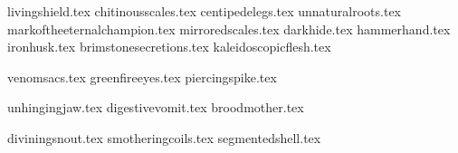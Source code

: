 

\daemonicmanifestationsintro

\subsubtitle{\guidingmanifestations}

\guidingmanifestationsdef

\subtitle{\manifestationsoffatherchaos}

\raggedcolumns
\begin{multicols}{2}

\startsortedpricelisthtgtNSP

{livingshield.tex}
{chitinousscales.tex}
{centipedelegs.tex}
{unnaturalroots.tex}
{markoftheeternalchampion.tex}
{mirroredscales.tex}
{darkhide.tex}
{hammerhand.tex}
{ironhusk.tex}
{brimstonesecretions.tex}
{kaleidoscopicflesh.tex}

\endsortedpricelisthtgtNSP

\subtitle{\manifestationsofenvy}

\startsortedpricelisthtgt

{venomsacs.tex}
{greenfireeyes.tex}
{piercingspike.tex}

\endsortedpricelisthtgt

\subtitle{\manifestationsofgluttony}
\startsortedpricelisthtgt

{unhingingjaw.tex}
{digestivevomit.tex}
{broodmother.tex}

\endsortedpricelisthtgt

\subtitle{\manifestationsofgreed}
\startsortedpricelisthtgt

{diviningsnout.tex}
{smotheringcoils.tex}
{segmentedshell.tex}


\end{multicols}
